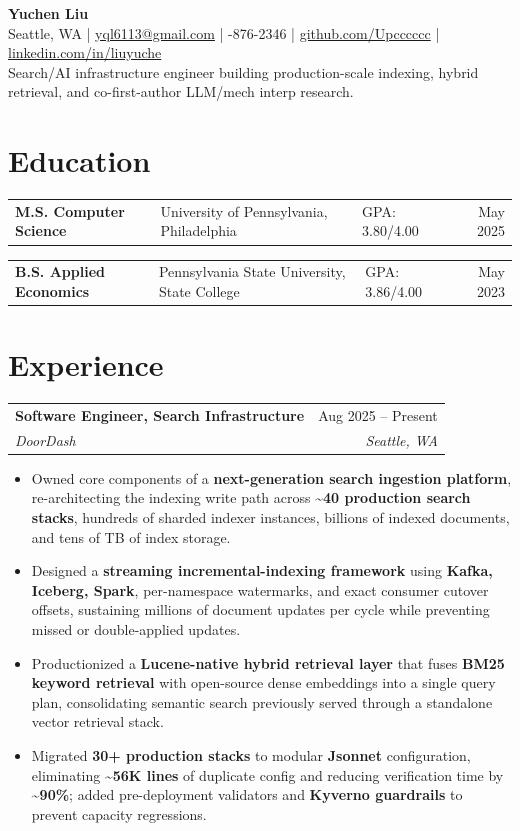 \documentclass[10pt,letterpaper]{article}
\makeatletter
\newcommand{\resumeRole}[4]{
  \begin{tabular*}{\textwidth}{@{\extracolsep{\fill}} l r}
    \textbf{#1} & #2 \\
    \textit{#3} & \textit{#4}
  \end{tabular*}
}
\newcommand{\educationRow}[4]{
  \begin{tabularx}{\textwidth}{@{}>{\bfseries}X l l r@{}}
    #1 & #2 & GPA: #3 & #4
  \end{tabularx}
}
\makeatother
\begin{document}
\begin{center}
  {\Huge \textbf{Yuchen Liu}}\\[-1pt]
  Seattle, WA \quad | \quad
  \href{mailto:yql6113@gmail.com}{yql6113@gmail.com} \quad | -876-2346 \quad | \quad
  \href{https://github.com/Upcccccc}{github.com/Upcccccc} \quad | \quad
  \href{https://www.linkedin.com/in/liuyuche/}{linkedin.com/in/liuyuche}\\
  \vspace{2pt}
  \textcolor{muted}{Search/AI infrastructure engineer building production-scale indexing, hybrid retrieval, and co-first-author LLM/mech interp research.}
  \vspace{8pt}
\end{center}

\section*{Education}
\educationRow{M.S. Computer Science}{University of Pennsylvania, Philadelphia}{3.80/4.00}{May 2025}
\educationRow{B.S. Applied Economics}{Pennsylvania State University, State College}{3.86/4.00}{May 2023}

\section*{Experience}
\resumeRole{Software Engineer, Search Infrastructure}{Aug 2025 -- Present}{DoorDash}{Seattle, WA}
\begin{itemize}
  \item Owned core components of a \textbf{next-generation search ingestion platform}, re-architecting the indexing write path across \textbf{\textasciitilde40 production search stacks}, hundreds of sharded indexer instances, billions of indexed documents, and tens of TB of index storage.
  \item Designed a \textbf{streaming incremental-indexing framework} using \textbf{Kafka, Iceberg, Spark}, per-namespace watermarks, and exact consumer cutover offsets, sustaining millions of document updates per cycle while preventing missed or double-applied updates.
  \item Productionized a \textbf{Lucene-native hybrid retrieval layer} that fuses \textbf{BM25 keyword retrieval} with open-source dense embeddings into a single query plan, consolidating semantic search previously served through a standalone vector retrieval stack.
  \item Migrated \textbf{30+ production stacks} to modular \textbf{Jsonnet} configuration, eliminating \textbf{\textasciitilde56K lines} of duplicate config and reducing verification time by \textbf{\textasciitilde90\%}; added pre-deployment validators and \textbf{Kyverno guardrails} to prevent capacity regressions.
\end{itemize}
\vspace{4pt}
\end{document}
